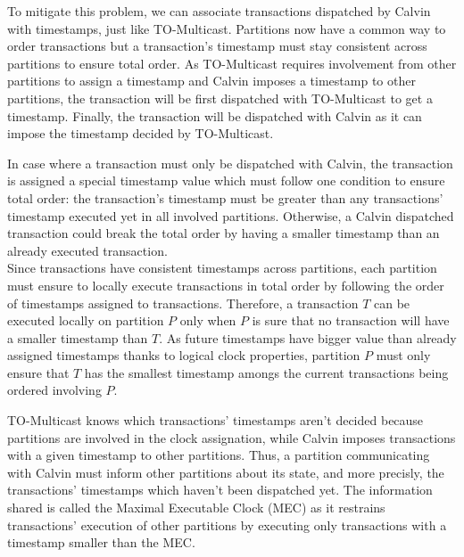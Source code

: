 \documentclass[a4paper, 10pt]{article}
\newcommand{\GE}{TO-Multicast}
\newcommand{\PE}{Calvin}
\begin{document}
   To mitigate this problem, we can associate transactions dispatched by \PE{} with
   timestamps, just like \GE{}. Partitions now have a common way to order transactions but
   a transaction's timestamp must stay consistent across partitions to ensure total order.
   As \GE{} requires involvement from other partitions to assign a timestamp and \PE{}
   imposes a timestamp to other partitions, the transaction will be first dispatched
   with \GE{} to get a timestamp. Finally, the transaction will be dispatched with \PE{}
   as it can impose the timestamp decided by \GE{}.

   In case where a transaction must only be dispatched with \PE{}, the transaction is
   assigned a special timestamp value which must follow one condition to ensure
   total order: the transaction's timestamp must be greater than any transactions' timestamp executed yet
   in all involved partitions.
   Otherwise, a \PE{} dispatched transaction could
   break the total order by having a smaller timestamp than an already executed
   transaction. \\

   Since transactions have consistent timestamps across partitions, each partition
   must ensure to locally execute transactions in total order by following the order
   of timestamps assigned to transactions.
   Therefore, a transaction $T$ can be executed locally on partition $P$ only when $P$ is sure that no
   transaction will have a smaller timestamp than $T$. As future timestamps have
   bigger value than already assigned timestamps thanks to logical clock properties,
   partition $P$ must only ensure that $T$ has the smallest timestamp amongs
   the current transactions being ordered involving $P$.

   \GE{} knows which transactions' timestamps aren't decided because partitions are involved in
   the clock assignation, while \PE{} imposes transactions with a given timestamp
   to other partitions. Thus, a partition communicating with \PE{} must inform
   other partitions about its state, and more precisly, the transactions' timestamps which haven't
   been dispatched yet.
   The information shared is called the Maximal Executable Clock (MEC) as
   it restrains transactions' execution of other partitions by executing only transactions with a timestamp
   smaller than the MEC.
\end{document}
